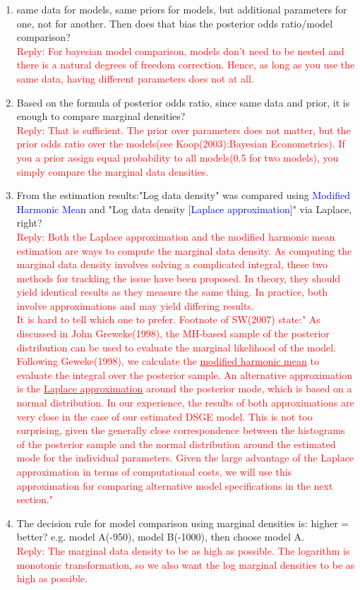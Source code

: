 \documentclass[cn,10pt,math=newtx,citestyle=gb7714-2015,bibstyle=gb7714-2015]{elegantbook}
\begin{document}
{{	\begin{enumerate}
		\item same data for models, same priors for models, but additional parameters for one, not for another. Then does that bias the posterior odds ratio/model comparison?\\
		\textcolor{red}{Reply: For bayesian model comparison, models don't need to be nested and there is a natural degrees of freedom correction. Hence, as long as you use the same data, having different parameters does not at all.}
		\item Based on the formula of posterior odds ratio, since same data and prior, it is enough to compare marginal densities?\\
		\textcolor{red}{Reply: That is sufficient. The prior over parameters does not matter, but the prior odds ratio over the models(see Koop(2003):Bayesian Econometrics). If you a prior assign equal probability to all models(0.5 for two models), you simply compare the marginal data densities.}
		\item From the estimation results:"Log data density" was compared using \textcolor{blue}{Modified Harmonic Mean} and "Log data density [\textcolor{blue}{Laplace approximation}]" via Laplace, right?\\
		\textcolor{red}{Reply: Both the Laplace approximation and the modified harmonic mean estimation are ways to compute the marginal data density. As computing the marginal data density involves solving a complicated integral, these two methods for trackling the issue have been proposed. In theory, they should yield identical results as they measure the same thing. In practice, both involve approximations and may yield differing results.\\
			It is hard to tell which one to prefer. Footnote of SW(2007) state:" As discussed in John Greweke(1998), the MH-based sample of the posterior distribution can be used to evaluate the marginal likelihood of the model. Following Geweke(1998), we calculate the \underline{modified harmonic mean} to evaluate the integral over the posterior sample. An alternative approximation is the \underline{Laplace approximation} around the posterior mode, which is based on a normal distribution. In our experience, the results of both approximations are very close in the case of our estimated DSGE model. This is not too surprising, given the generally close correspondence between the histograms of the posterior sample and the normal distribution around the estimated mode for the individual parameters. Given the large advantage of the Laplace approximation in terms of computational costs, we will use this approximation for comparing alternative model specifications in the next section."}
		\item The decision rule for model comparison using marginal densities is: higher = better? e.g. model A(-950), model B(-1000), then choose model A.\\
		\textcolor{red}{Reply: The marginal data density to be as high as possible. The logarithm is monotonic transformation, so we also want the log marginal densities to be as high as possible.}
		

\end{enumerate}}}
\end{document}
